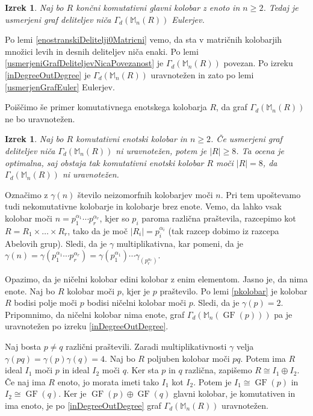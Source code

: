 \documentclass[a4paper, 12pt]{amsart}
\theoremstyle{definition} %
\theoremstyle{plain} %
\newtheorem{izrek}[definicija]{Izrek}
\newcommand{\M}{\mathbb M}
\DeclareMathOperator{\GF}{GF}
\begin{document}
\begin{izrek}
Naj bo $R$ končni komutativni glavni kolobar z enoto in $n\ge 2$. Tedaj je usmerjeni graf deliteljev niča $\Gamma_d(\M_n(R))$ Eulerjev.
\end{izrek}

\proof
Po lemi \ref{enostranskiDelitelji0Matricni} vemo, da sta v matričnih kolobarjih množici levih  in desnih deliteljev niča enaki. Po lemi \ref{usmerjeniGrafDeliteljevNicaPovezanost} je $\Gamma_d(\M_n(R))$ povezan. Po izreku \ref{inDegreeOutDegree} je $\Gamma_d(\M_n(R))$ uravnotežen in zato po lemi \ref{usmerjenGrafEuler} Eulerjev.
\endproof

Poiščimo še primer komutativnega enotskega kolobarja $R$, da graf $\Gamma_d(\M_n(R))$ ne bo uravnotežen.

\begin{izrek}
Naj bo $R$ komutativni enotski kolobar in $n\ge2$. Če usmerjeni graf deliteljev niča $\Gamma_d(\M_n(R))$ ni uravnotežen, potem je $|R| \ge 8$. Ta ocena je optimalna, saj obstaja tak komutativni enotski kolobar $R$ moči $|R|=8$, da $\Gamma_d(\M_n(R))$ ni uravnotežen. 
\end{izrek} 

\proof
Označimo z $\gamma(n)$ število neizomorfnih kolobarjev moči $n$. Pri tem upoštevamo tudi nekomutativne kolobarje in kolobarje brez enote. Vemo, da lahko vsak kolobar moči $n=p_1^{\alpha_1}\cdots p_r^{\alpha_r}$, kjer so $p_i$ paroma različna praštevila, razcepimo kot $R=R_1\times \dots \times R_r$, tako da je moč $|R_i| = p_i^{\alpha_i}$ (tak razcep dobimo iz razcepa Abelovih grup). Sledi, da je $\gamma$ multiplikativna, kar pomeni, da je $\gamma(n) = \gamma(p_1^{\alpha_1}\cdots p_r^{\alpha_r}) = \gamma(p_1^{\alpha_1})\cdots \gamma_(p_r^{\alpha_r})$. 

Opazimo, da je ničelni kolobar edini kolobar  z enim elementom. Jasno je, da nima enote. Naj bo $R$ kolobar moči $p$, kjer je $p$ praštevilo. Po lemi \ref{pkolobar} je kolobar $R$ bodisi polje moči $p$ bodisi ničelni kolobar moči $p$. Sledi, da je $\gamma(p)= 2$. Pripomnimo, da ničelni kolobar nima enote, graf $\Gamma_d(\M_n(\GF(p)))$ pa je uravnotežen po izreku \ref{inDegreeOutDegree}. 

Naj bosta $p\neq q$ različni praštevili. Zaradi multiplikativnosti $\gamma$ velja $\gamma(pq) = \gamma(p)\gamma(q) = 4$. Naj bo $R$ poljuben kolobar moči $pq$. Potem ima $R$ ideal $I_1$ moči $p$ in ideal $I_2$ moči $q$. Ker sta $p$ in $q$ različna,  zapišemo $R\cong I_1 \oplus I_2$. Če naj ima $R$ enoto, jo morata imeti tako $I_1$ kot $I_2$. Potem je $I_1\cong \GF(p)$ in $I_2\cong \GF(q)$. Ker je $\GF(p) \oplus \GF(q)$ glavni kolobar,  je  komutativen in ima enoto, je po \ref{inDegreeOutDegree} graf $\Gamma_d(\M_n(R))$ uravnotežen. 
\end{document}
